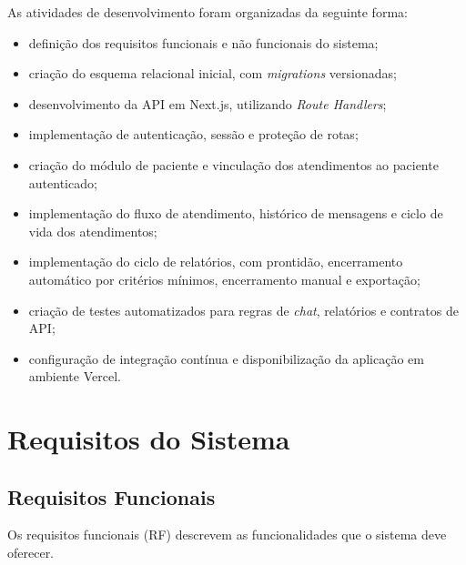 As atividades de desenvolvimento foram organizadas da seguinte forma:

\begin{itemize}
\item definição dos requisitos funcionais e não funcionais do sistema;
\item criação do esquema relacional inicial, com \textit{migrations} versionadas;
\item desenvolvimento da API em Next.js, utilizando \textit{Route Handlers};
\item implementação de autenticação, sessão e proteção de rotas;
\item criação do módulo de paciente e vinculação dos atendimentos ao paciente autenticado;
\item implementação do fluxo de atendimento, histórico de mensagens e ciclo de vida dos atendimentos;
\item implementação do ciclo de relatórios, com prontidão, encerramento automático por critérios mínimos, encerramento manual e exportação;
\item criação de testes automatizados para regras de \textit{chat}, relatórios e contratos de API;
\item configuração de integração contínua e disponibilização da aplicação em ambiente Vercel.
\end{itemize}

\section{Requisitos do Sistema}

\subsection{Requisitos Funcionais}

Os requisitos funcionais (RF) descrevem as funcionalidades que o sistema deve oferecer.

